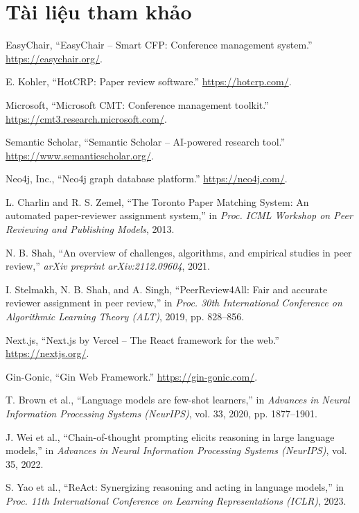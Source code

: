 \documentclass[12pt,a4paper]{article}
\begin{document}
\section*{Tài liệu tham khảo}
\begin{enumerate}[label={[\arabic*]},leftmargin=2.2em,itemsep=0.15\baselineskip,topsep=0.2\baselineskip]
  \item EasyChair, ``EasyChair -- Smart CFP: Conference management system.'' \url{https://easychair.org/}.
  \item E. Kohler, ``HotCRP: Paper review software.'' \url{https://hotcrp.com/}.
  \item Microsoft, ``Microsoft CMT: Conference management toolkit.'' \url{https://cmt3.research.microsoft.com/}.
  \item Semantic Scholar, ``Semantic Scholar -- AI-powered research tool.'' \url{https://www.semanticscholar.org/}.
  \item Neo4j, Inc., ``Neo4j graph database platform.'' \url{https://neo4j.com/}.
  \item L. Charlin and R. S. Zemel, ``The Toronto Paper Matching System: An automated paper-reviewer assignment system,'' in \textit{Proc. ICML Workshop on Peer Reviewing and Publishing Models}, 2013.
  \item N. B. Shah, ``An overview of challenges, algorithms, and empirical studies in peer review,'' \textit{arXiv preprint arXiv:2112.09604}, 2021.
  \item I. Stelmakh, N. B. Shah, and A. Singh, ``PeerReview4All: Fair and accurate reviewer assignment in peer review,'' in \textit{Proc. 30th International Conference on Algorithmic Learning Theory (ALT)}, 2019, pp. 828--856.
  \item Next.js, ``Next.js by Vercel -- The React framework for the web.'' \url{https://nextjs.org/}.
  \item Gin-Gonic, ``Gin Web Framework.'' \url{https://gin-gonic.com/}.
  \item T. Brown et al., ``Language models are few-shot learners,'' in \textit{Advances in Neural Information Processing Systems (NeurIPS)}, vol. 33, 2020, pp. 1877--1901.
  \item J. Wei et al., ``Chain-of-thought prompting elicits reasoning in large language models,'' in \textit{Advances in Neural Information Processing Systems (NeurIPS)}, vol. 35, 2022.
  \item S. Yao et al., ``ReAct: Synergizing reasoning and acting in language models,'' in \textit{Proc. 11th International Conference on Learning Representations (ICLR)}, 2023.
\end{enumerate}
\end{document}

